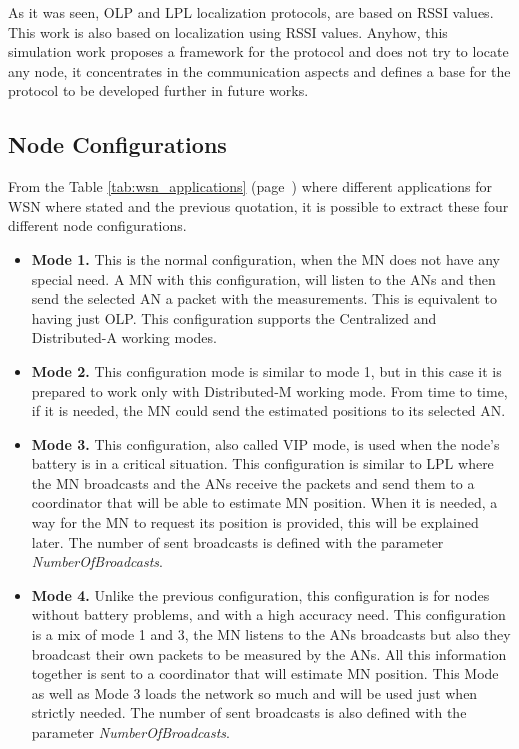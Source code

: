 As it was seen, \ac{OLP} and \ac{LPL} localization protocols, are based on \ac{RSSI} values. This work is also based on localization using 
\ac{RSSI} values. Anyhow, this simulation work proposes a framework for the protocol and does not try to locate any node, it concentrates
in the communication aspects and defines a base for the protocol to be developed further in future works.


\subsection{Node Configurations}

From the Table \ref{tab:wsn_applications} (page~\pageref{tab:wsn_applications}) where different applications for \ac{WSN} where stated and the
previous quotation, it is possible to extract these four different node configurations.

\begin{itemize}
 \item \textbf{Mode 1.} This is the normal configuration, when the \ac{MN} does not have any special need. A \ac{MN} with this configuration,
will listen to the \acp{AN} and then send the selected \ac{AN} a packet with the measurements. This is equivalent to having just \ac{OLP}. This
configuration supports the Centralized and Distributed-A working modes.

 \item \textbf{Mode 2.} This configuration mode is similar to mode 1, but in this case it is prepared to work only with Distributed-M working mode.
From time to time, if it is needed, the \ac{MN} could send the estimated positions to its selected \ac{AN}.

 \item \textbf{Mode 3.} This configuration, also called \ac{VIP} mode, is used when the node's battery is in a critical situation.
This configuration is similar to \ac{LPL} where the \ac{MN} broadcasts and the \acp{AN} receive the packets and send them to a coordinator that
will be able to estimate \ac{MN} position. When it is needed, a way for the \ac{MN} to request its position is provided, this will be explained 
later. The number of sent broadcasts is defined with the parameter \textit{NumberOfBroadcasts}.

 \item \textbf{Mode 4.} Unlike the previous configuration, this configuration is for nodes without battery problems, and with a high accuracy
need. This configuration is a mix of mode 1 and 3, the \ac{MN} listens to the \acp{AN} broadcasts but also they broadcast their
own packets to be measured by the \acp{AN}. All this information together is sent to a coordinator that will estimate \ac{MN} position.
This Mode as well as Mode 3 loads the network so much and will be used just when strictly needed. The number of sent broadcasts is also defined with 
the parameter \textit{NumberOfBroadcasts}.
\end{itemize}

